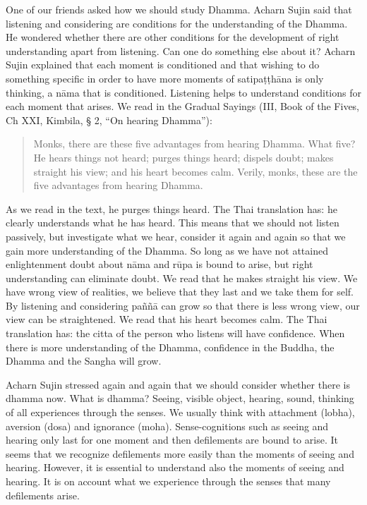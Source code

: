 One of our friends asked how we should study Dhamma. Acharn Sujin said that listening and considering are conditions for the understanding of the Dhamma. He wondered whether there are other conditions for the development of right understanding apart from listening. Can one do something else about it? Acharn Sujin explained that each moment is conditioned and that wishing to do something specific in order to have more moments of satipaṭṭhāna is only thinking, a nāma that is conditioned. Listening helps to understand conditions for each moment that arises.
We read in the Gradual Sayings (III, Book of the Fives, Ch XXI, Kimbila, § 2, ``On hearing Dhamma''):

\begin{quote}
Monks, there are these five advantages from hearing Dhamma. What five?
He hears things not heard; purges things heard; dispels doubt; makes straight his view; and his heart becomes calm. Verily, monks, these are the five advantages from hearing Dhamma.
\end{quote}

As we read in the text, he purges things heard. The Thai translation has: he clearly understands what he has heard. This means that we should not listen passively, but investigate what we hear, consider it again and again so that we gain more understanding of the Dhamma. So long as we have not attained enlightenment doubt about nāma and rūpa is bound to arise, but right understanding can eliminate doubt. We read that he makes straight his view. We have wrong view of realities, we believe that they last and we take them for self. By listening and considering paññā can grow so that there is less wrong view, our view can be straightened. We read that his heart becomes calm. The Thai translation has: the citta of the person who listens will have confidence. When there is more understanding of the Dhamma, confidence in the Buddha, the Dhamma and the Sangha will grow.

Acharn Sujin stressed again and again that we should consider whether there is dhamma now. What is dhamma? Seeing, visible object, hearing, sound, thinking of all experiences through the senses. We usually think with attachment (lobha), aversion (dosa) and ignorance (moha). Sense-cognitions such as seeing and hearing only last for one moment and then defilements are bound to arise. It seems that we recognize defilements more easily than the moments of seeing and hearing. However, it is essential to understand also the moments of seeing and hearing. It is on account what we experience through the senses that many defilements arise.

